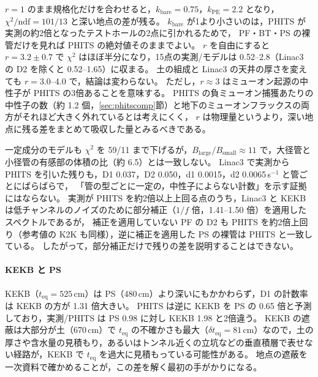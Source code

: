\documentclass[a4paper,11pt]{ltjsarticle}
\newcommand{\teq}{t_{\mathrm{eq}}}
\begin{document}
$r=1$ のまま規格化だけを合わせると，$k_{\mathrm{bare}}=0.75$，$k_{\mathrm{PE}}=2.2$ となり，$\chi^2/\mathrm{ndf}=101/13$ と深い地点の差が残る。
$k_{\mathrm{bare}}$ が1より小さいのは，PHITS が実測の約2倍となったテストホールの2点に引かれるためで，
PF・BT・PS の裸管だけを見れば PHITS の絶対値そのままでよい。
$r$ を自由にすると $r=3.2\pm0.7$ で $\chi^2$ はほぼ半分になり，15点の実測/モデルは 0.52--2.8（Linac3 の D2 を除くと 0.52--1.65）に収まる。
土の組成と Linac3 の天井の厚さを変えても $r=3.0$--4.0 で，結論は変わらない。
ただし，$r\approx3$ はミューオン起源の中性子が PHITS の3倍あることを意味する。
PHITS の負ミューオン捕獲あたりの中性子の数（約 1.2 個，\ref{sec:phitscomp}節）と地下のミューオンフラックスの両方がそれほど大きく外れているとは考えにくく，
$r$ は物理量というより，深い地点に残る差をまとめて吸収した量とみるべきである。

一定成分のモデルも $\chi^2$ を 59/11 まで下げるが，$B_{\mathrm{large}}/B_{\mathrm{small}}\approx11$ で，大径管と小径管の有感部の体積の比（約 6.5）とは一致しない。
Linac3 で実測から PHITS を引いた残りも，D1 0.037，D2 0.050，d1 0.0015，d2 0.0065\,s$^{-1}$ と管ごとにばらばらで，
「管の型ごとに一定の，中性子によらない計数」を示す証拠にはならない。
実測が PHITS を約2倍以上上回る点のうち，Linac3 と KEKB は低チャンネルのノイズのために部分補正（$1/f$ 倍，1.41--1.50 倍）を適用したスペクトルであるが，
補正を適用していない PF の D2 も PHITS を約2倍上回り（参考値の K2K も同様），逆に補正を適用した PS の裸管は PHITS と一致している。
したがって，部分補正だけで残りの差を説明することはできない。

\paragraph{KEKB と PS}
KEKB（$\teq=525$\,cm）は PS（480\,cm）より深いにもかかわらず，D1 の計数率は KEKB の方が 1.31 倍大きい。
PHITS は逆に KEKB を PS の 0.65 倍と予測しており，実測/PHITS は PS 0.98 に対し KEKB 1.98 と2倍違う。
KEKB の遮蔽は大部分が土（670\,cm）で $\teq$ の不確かさも最大（$\delta\teq=81$\,cm）なので，土の厚さや含水量の見積もり，あるいはトンネル近くの立坑などの垂直積層で表せない経路が，KEKB で $\teq$ を過大に見積もっている可能性がある。
地点の遮蔽を一次資料で確かめることが，この差を解く最初の手がかりになる。
\end{document}
